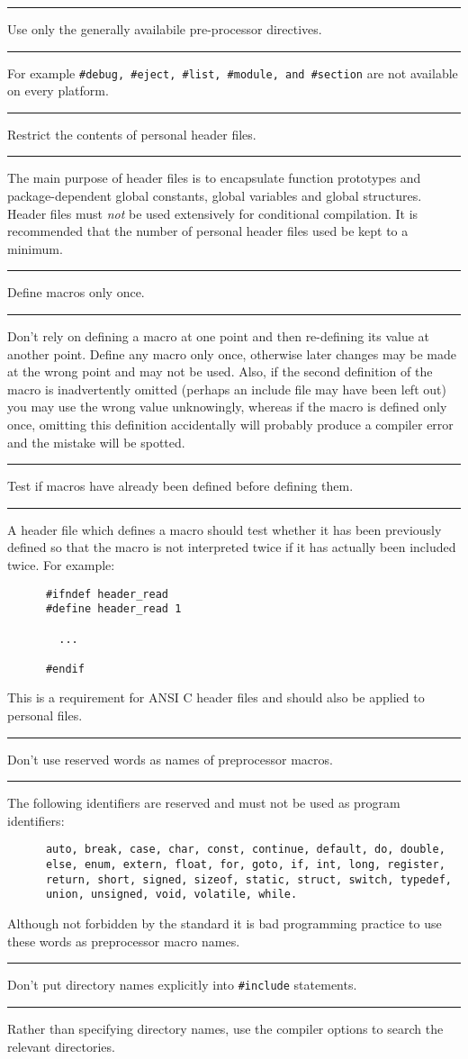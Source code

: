 \documentclass[twoside,11pt]{article}
\newcounter{sruleno}
\newcommand{\srule}[1]{
    \addtocounter{sruleno}{1}
    \goodbreak
    \rule[0.5ex]{\textwidth}{0.3mm}
    {\Large #1 \hfill {\thesruleno}}
    \rule[0.5ex]{\textwidth}{0.1mm}
}
\newcommand{\srule}[1]{
       \addtocounter{sruleno}{1}
       \begin{rawhtml} <HR> \end{rawhtml}
       {\Large \thesruleno}~~~~{\Large #1}
       \begin{rawhtml} <HR> \end{rawhtml}
       \end{tabular}
  }
\begin{document}
\newpage
\srule{Use only the generally availabile pre-processor directives.}
For example \verb~#debug, #eject, #list, #module, and #section~
are not available on every platform.

\srule{Restrict the contents of personal header files.}
The main purpose of header files is to encapsulate function prototypes 
and package-dependent global constants, global variables and global structures.
Header files must {\sl not\/} be used extensively for conditional
compilation.  It is recommended that the number of personal header files used  
be kept to a minimum.

\srule{Define macros only once.}
Don't rely on defining a macro at one point and then re-defining its
value at another point. Define any macro only once, otherwise later changes may
be made at the wrong point and may not be used. Also, if the second
definition of the macro is inadvertently omitted (perhaps an include 
file may have been left out) you 
may use the wrong value unknowingly, 
whereas if the macro is defined
only once, omitting this definition accidentally will probably produce 
a compiler error and the mistake will be spotted. 


\srule{Test if macros have already been defined before defining them.}
A header file which defines a macro  should test whether it has been
previously defined  so that the macro is
not interpreted twice if it has actually been included twice. For example:
\begin{verbatim}
      #ifndef header_read
      #define header_read 1

        ...

      #endif
\end{verbatim}
This is a requirement for ANSI C header files and should also be applied to 
personal files.

\srule{Don't use reserved words as names of preprocessor macros.}
The following identifiers are reserved and must not be used as program 
identifiers:
\begin{verbatim}
      auto, break, case, char, const, continue, default, do, double, 
      else, enum, extern, float, for, goto, if, int, long, register,
      return, short, signed, sizeof, static, struct, switch, typedef, 
      union, unsigned, void, volatile, while.
\end{verbatim}
Although  not forbidden by the standard it is bad programming practice
to use these words as preprocessor macro names.


\srule{Don't put directory names explicitly into {\tt \#include} statements.}
Rather than specifying directory names, use the
compiler options to search the relevant directories.
\end{document}
